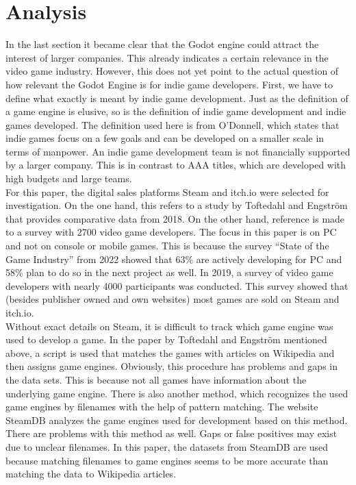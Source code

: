 \section{Analysis}
In the last section it became clear that the Godot engine could attract the interest of larger companies.
This already indicates a certain relevance in the video game industry.
However, this does not yet point to the actual question of how relevant the Godot Engine is for indie game developers.
First, we have to define what exactly is meant by indie game development.
Just as the definition of a game engine is elusive, so is the definition of indie game development and indie games developed.
The definition used here is from O'Donnell, which states that indie games focus on a few goals and can be developed on a smaller scale in terms of manpower\cite{indie-definition}.
An indie game development team is not financially supported by a larger company.
This is in contrast to AAA titles, which are developed with high budgets and large teams.\\

For this paper, the digital sales platforms Steam and itch.io were selected for investigation.
On the one hand, this refers to a study by Toftedahl and Engström that provides comparative data from 2018\cite{game-engine-taxonomy}.
On the other hand, reference is made to a survey with 2700 video game developers.
The focus in this paper is on PC and not on console or mobile games.
This is because the survey ``State of the Game Industry'' from 2022 showed that 63\% are actively developing for PC and 58\% plan to do so in the next project as well\cite{gdc-2022}.
In 2019, a survey of video game developers with nearly 4000 participants was conducted\cite{gdc-2019}.
This survey showed that (besides publisher owned and own websites) most games are sold on Steam and itch.io.\\

Without exact details on Steam, it is difficult to track which game engine was used to develop a game.
In the paper by Toftedahl and Engström mentioned above, a script is used that matches the games with articles on Wikipedia and then assigns game engines.
Obviously, this procedure has problems and gaps in the data sets.
This is because not all games have information about the underlying game engine.
There is also another method, which recognizes the used game engines by filenames with the help of pattern matching.
The website SteamDB analyzes the game engines used for development based on this method\cite{steamdb-tech}.
There are problems with this method as well.
Gaps or false positives may exist due to unclear filenames.
In this paper, the datasets from SteamDB are used because matching filenames to game engines seems to be more accurate than matching the data to Wikipedia articles.\\

